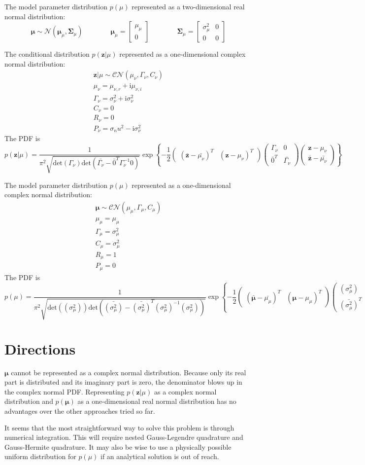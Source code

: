 \documentclass{article}         %
\theoremstyle{definition}
\theoremstyle{remark}
\newcommand{\eq}[1]{\begin{equation} #1 \end{equation}}
\newcommand{\zbf}{\mathbf{z}}
\newcommand{\mubf}{\boldsymbol{\mu}}
\newcommand{\Sigmabf}{\boldsymbol{\Sigma}}
\newcommand{\zcond}{\mathbf{z}|\mu}
\newcommand{\Nscript}{\mathcal{N}}
\newcommand{\CNscript}{\mathcal{CN}}
\newcommand{\im}{\mathrm{i}}
\newcommand{\paren}[1]{\left(#1\right)}
\newcommand{\bracket}[1]{\left[#1\right]}
\newcommand{\arr}[2]{\begin{array}{#1} #2 \end{array}}
\newcommand{\brkarray}[2]{\bracket{\arr{#1}{#2}}}
\newcommand{\qq}{\qquad\qquad}
\newcommand{\CNpdf}[5]{\frac{1}{\pi^{#1}\sqrt{\mathrm{det}\paren{#4}\mathrm{det}\paren{\bar{#4} - \bar{#5}^T#4^{-1}#5}}} \exp\left\{-\frac{1}{2} \paren{\begin{array}{cc}\paren{\bar{#2} - \bar{#3}}^T & \paren{#2 - #3}^T\end{array}} \paren{\begin{array}{cc} #4 & #5 \\ \bar{#5}^T & \bar{#4} \end{array}}\paren{\begin{array}{c} #2 - #3 \\ \bar{#2} - \bar{#3} \end{array}}\right\}}
\begin{document}
The model parameter distribution $p\paren{\mu}$ represented as a two-dimensional real normal distribution:
\eq{\mubf \sim \Nscript\paren{\mubf_\mu,\Sigmabf_\mu}
	\qq \mubf_\mu = \brkarray{c}{ \mu_\mu \\ 0 }
	\qq \Sigmabf_\mu = \brkarray{cc}{ \sigma_\mu^2 & 0 \\ 0 & 0 }}

The conditional distribution $p\paren{\zcond}$ represented as a one-dimensional complex normal distribution:
\eq{\arr{c}{ \zcond\sim\CNscript\paren{\mu_\nu,\Gamma_\nu,C_\nu} \\
	\mu_\nu = \mu_{\nu,r} + \im\mu_{\nu,i} \\
	\Gamma_\nu = \sigma_\nu^2 + \im\sigma_\nu^2 \\
	C_\nu = 0 \\
	R_\nu = 0 \\
	P_\nu = \sigma_nu^2 - \im\sigma_\nu^2 }}
The PDF is
\eq{p\paren{\zcond} = \CNpdf{2}{\zbf}{\mu_\nu}{\Gamma_\nu}{0}} 

The model parameter distribution $p\paren{\mu}$ represented as a one-dimensional complex normal distribution:
\eq{\arr{c}{ \mubf \sim \CNscript\paren{\mu_\mu,\Gamma_\mu,C_\mu} \\
	\mu_\mu = \mu_\mu \\
	\Gamma_\mu = \sigma_\mu^2 \\
	C_\mu = \sigma_\mu^2 \\
	R_\mu = 1 \\
	P_\mu = 0 }}
The PDF is
\eq{p\paren{\mu} = \CNpdf{2}{\mubf}{\mu_\mu}{\paren{\sigma_\mu^2}}{\paren{\sigma_\mu^2}}}

\section{Directions}\label{Directions}

$\mubf$ cannot be represented as a complex normal distribution. Because only its real part is distributed and its imaginary part is zero, the denominator blows up in the complex normal PDF. Representing $p\paren{\zcond}$ as a complex normal distribution and $p\paren{\mubf}$ as a one-dimensional real normal distribution has no advantages over the other approaches tried so far.

It seems that the most straightforward way to solve this problem is through numerical integration. This will require nested Gauss-Legendre quadrature and Gauss-Hermite quadrature. It may also be wise to use a physically possible uniform distribution for $p\paren{\mu}$ if an analytical solution is out of reach.
\end{document}
